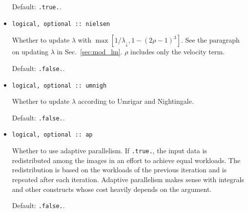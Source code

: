 \documentclass{article}
\begin{document}
\begin{itemize}
  Default: \texttt{.true.}.
\item 
\begin{verbatim}
logical, optional :: nielsen
\end{verbatim}
  Whether to update $\lambda$ with
  $\max[1/\lambda_\downarrow,1-(2\rho-1)^3]$. See the paragraph on
  updating $\lambda$ in Sec.~\ref{sec:mod_lm}. $\rho$ includes only
  the velocity term.

  Default: \texttt{.false.}.
\item 
\begin{verbatim}
logical, optional :: umnigh
\end{verbatim}
  Whether to update $\lambda$ according to Umrigar and Nightingale.

  Default: \texttt{.false.}.
\item 
\begin{verbatim}
logical, optional :: ap
\end{verbatim}
  Whether to use adaptive parallelism. If \verb+.true.+, the input
  data is redistributed among the images in an effort to achieve equal
  workloads. The redistribution is based on the workloads of the
  previous iteration and is repeated after each iteration. Adaptive
  parallelism makes sense with integrals and other constructs whose
  cost heavily depends on the argument.

  Default: \verb+.false.+.
\end{itemize}
\end{document}
